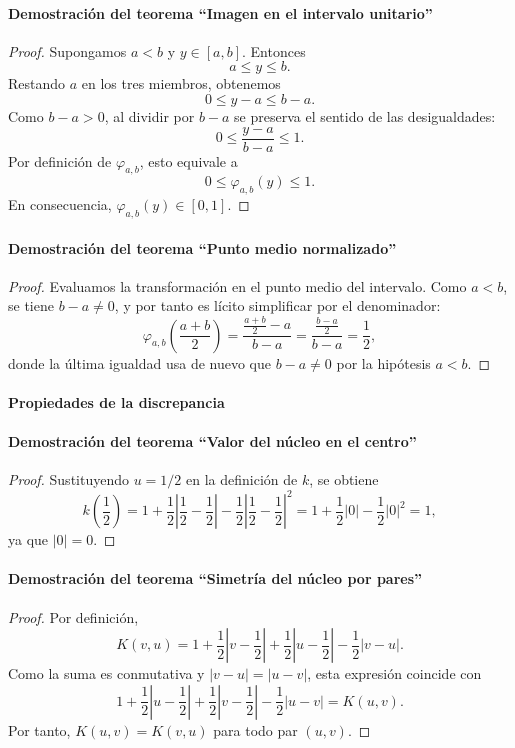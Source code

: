\documentclass[12pt]{report} %
\begin{document}
\paragraph*{Demostración del teorema ``Imagen en el intervalo unitario''}
\begin{proof}
    Supongamos $a < b$ y $y \in [a,b]$. Entonces
    $$a \le y \le b.$$
    Restando $a$ en los tres miembros, obtenemos
    $$0 \le y-a \le b-a.$$
    Como $b-a > 0$, al dividir por $b-a$ se preserva el sentido de las desigualdades:
    $$0 \le \frac{y-a}{b-a} \le 1.$$
    Por definición de $\varphi_{a,b}$, esto equivale a
    $$0 \le \varphi_{a,b}(y) \le 1.$$
    En consecuencia, $\varphi_{a,b}(y) \in [0,1]$.
\end{proof}

\paragraph*{Demostración del teorema ``Punto medio normalizado''}
\begin{proof}
    Evaluamos la transformación en el punto medio del intervalo. Como $a < b$, se tiene $b-a \neq 0$, y por tanto es lícito simplificar por el denominador:
    $$\varphi_{a,b}\!\left(\frac{a+b}{2}\right)
        = \frac{\frac{a+b}{2}-a}{b-a}
        = \frac{\frac{b-a}{2}}{b-a}
        = \frac{1}{2},$$
    donde la última igualdad usa de nuevo que $b-a \neq 0$ por la hipótesis $a < b$.
\end{proof}

\paragraph*{Propiedades de la discrepancia}

\paragraph*{Demostración del teorema ``Valor del núcleo en el centro''}
\begin{proof}
    Sustituyendo $u = 1/2$ en la definición de $k$, se obtiene
    $$k\!\left(\frac{1}{2}\right)
        = 1 + \frac{1}{2}\left|\frac{1}{2} - \frac{1}{2}\right| - \frac{1}{2}\left|\frac{1}{2} - \frac{1}{2}\right|^2
        = 1 + \frac{1}{2}|0| - \frac{1}{2}|0|^2
        = 1,$$
    ya que $|0| = 0$.
\end{proof}

\paragraph*{Demostración del teorema ``Simetría del núcleo por pares''}
\begin{proof}
    Por definición,
    $$K(v,u) = 1 + \frac{1}{2}\left|v - \frac{1}{2}\right| + \frac{1}{2}\left|u - \frac{1}{2}\right| - \frac{1}{2}|v-u|.$$
    Como la suma es conmutativa y $|v-u| = |u-v|$, esta expresión coincide con
    $$1 + \frac{1}{2}\left|u - \frac{1}{2}\right| + \frac{1}{2}\left|v - \frac{1}{2}\right| - \frac{1}{2}|u-v| = K(u,v).$$
    Por tanto, $K(u,v) = K(v,u)$ para todo par $(u,v)$.
\end{proof}
\end{document}
